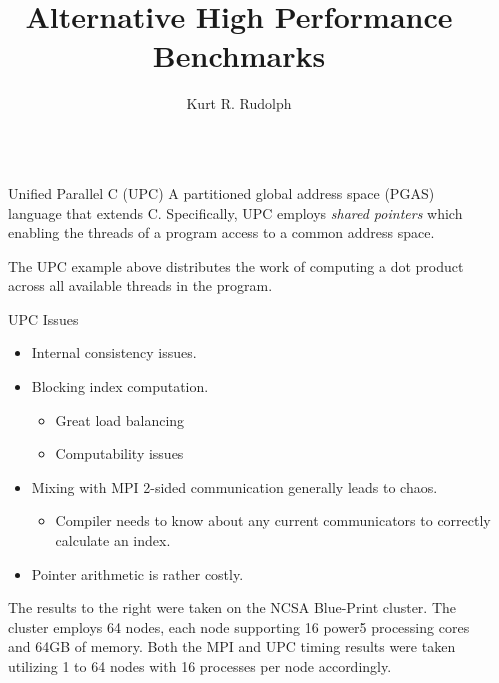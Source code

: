\documentclass[final]{beamer}
\title{Alternative High Performance Benchmarks}
\author{Kurt R. Rudolph}
\institute{Department of Computer Science, University of Illinois Urbana-Champaign}
\newlength{\sepwid}
\newlength{\onecolwid}
\begin{document}
\begin{frame}[t]
	\begin{columns}[t]												%
		\begin{column}{\sepwid}\end{column}			%
			\begin{column}{\onecolwid}
				\begin{block}{Unified Parallel C (UPC)}
					A partitioned global address space (PGAS) language that extends C. Specifically, UPC employs \emph{shared pointers} which enabling the threads of a program access to a common address space.
					
					The UPC example above distributes the work of computing a dot product across all available threads in the program. 
				\end{block}
				\vspace{2 mm}
				\begin{alertblock}{UPC Issues}
					\begin{itemize}
						\item Internal consistency issues.
						\item Blocking index computation.
							\begin{itemize}
							\item Great load balancing 
							\item Computability issues
							\end{itemize}
						\item Mixing with MPI 2-sided communication generally leads to chaos.
							\begin{itemize}
								\item Compiler needs to know about any current communicators to correctly calculate an index.
							\end{itemize}
						\item Pointer arithmetic is rather costly.
					\end{itemize}
				\end{alertblock}
					The results to the right were taken on the NCSA Blue-Print cluster.  The cluster employs 64 nodes, each node supporting 16 power5 processing cores and 64GB of memory.  Both the MPI and UPC timing results were taken utilizing 1 to 64 nodes with 16 processes per node accordingly.  \\
					\tiny{}
\end{column}
\end{columns}
\end{frame}
\end{document}
